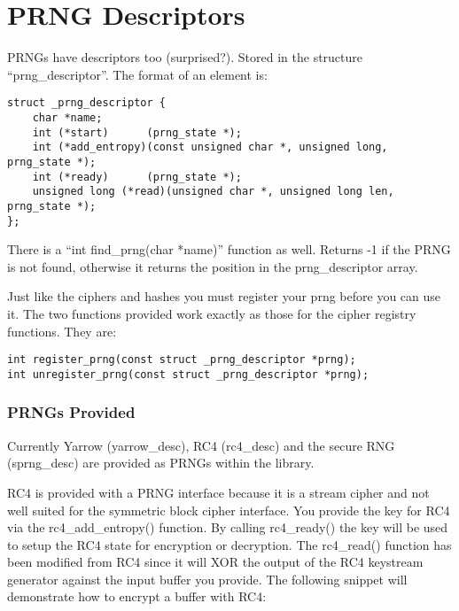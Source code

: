 \documentclass[b5paper]{book}
\begin{document}
\section{PRNG Descriptors}
PRNGs have descriptors too (surprised?). Stored in the structure ``prng\_descriptor''.  The format of an element is:
\begin{verbatim}
struct _prng_descriptor {
    char *name;
    int (*start)      (prng_state *);
    int (*add_entropy)(const unsigned char *, unsigned long, prng_state *);
    int (*ready)      (prng_state *);
    unsigned long (*read)(unsigned char *, unsigned long len, prng_state *);
};
\end{verbatim}

There is a ``int find\_prng(char *name)'' function as well.  Returns -1 if the PRNG is not found, otherwise it returns
the position in the prng\_descriptor array.

Just like the ciphers and hashes you must register your prng before you can use it.  The two functions provided work
exactly as those for the cipher registry functions.  They are:
\begin{verbatim}
int register_prng(const struct _prng_descriptor *prng);
int unregister_prng(const struct _prng_descriptor *prng);
\end{verbatim}

\subsubsection{PRNGs Provided}
Currently Yarrow (yarrow\_desc), RC4 (rc4\_desc) and the secure RNG (sprng\_desc) are provided as PRNGs within the 
library.  

RC4 is provided with a PRNG interface because it is a stream cipher and not well suited for the symmetric block cipher
interface.  You provide the key for RC4 via the rc4\_add\_entropy() function.  By calling rc4\_ready() the key will be used
to setup the RC4 state for encryption or decryption.  The rc4\_read() function has been modified from RC4 since it will 
XOR the output of the RC4 keystream generator against the input buffer you provide.  The following snippet will demonstrate
how to encrypt a buffer with RC4:
\end{document}
